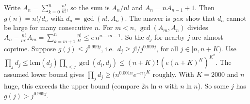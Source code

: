 \documentclass[11pt,a4paper]{article}
\begin{document}
 Write $A_n=\sum_{k=0}^n\frac{n!}{k!}$, so the sum is $A_n/n!$ and $A_n=nA_{n-1}+1$. Then $g(n)=n!/d_n$ with $d_n=\gcd(n!,A_n)$. The answer is \emph{yes}: show that $d_n$ cannot be large for many consecutive $n$.
 For $m<n$, $\gcd(A_m,A_n)$ divides $A_n-\frac{n!}{m!}A_m=\sum_{k=m+1}^n\frac{n!}{k!}\le e\,n^{n-m-1}$. So the $d_j$ for nearby $j$ are almost coprime.
 Suppose $g(j)\le j^{0.999j}$, i.e.\ $d_j\ge j!/j^{0.999j}$, for all $j\in[n,n+K)$. Use $\prod_jd_j\le\mathrm{lcm}(d_j)\prod_{i<j}\gcd(d_i,d_j)\le(n+K)!\,(e(n+K)^K)^{K^2}$.
 The assumed lower bound gives $\prod_jd_j\ge\bigl(n^{0.001n}e^{-n}\bigr)^K$ roughly. With $K=2000$ and $n$ huge, this exceeds the upper bound (compare $2n\ln n$ with $n\ln n$). So some $j$ has $g(j)>j^{0.999j}$.
\end{document}
